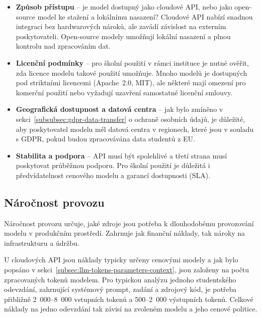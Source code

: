 \begin{itemize}
    \item \textbf{Způsob přístupu} -- je model dostupný jako cloudové API, nebo jako open-source model ke stažení a lokálnímu nasazení?
    Cloudové API nabízí snadnou integraci bez hardwarových nároků, ale zavádí závislost na externím poskytovateli.
    Open-source modely umožňují lokální nasazení a plnou kontrolu nad zpracováním dat.

    \item \textbf{Licenční podmínky} -- pro školní použití v rámci instituce je nutné ověřit, zda licence modelu takové použití umožňuje.
    Mnoho modelů je dostupných pod striktními licencemi (Apache~2.0, MIT), ale některé mají omezení pro komerční použití nebo vyžadují uzavření samostatné licenční smlouvy.

    \item \textbf{Geografická dostupnost a datová centra} -- jak bylo zmíněno v sekci~\ref{subsubsec:gdpr-data-transfer} o ochraně osobních údajů, je důležité, aby poskytovatel modelu měl datová centra v regionech, které jsou v souladu s GDPR, pokud budou zpracovávána data studentů z EU\@.

    \item \textbf{Stabilita a podpora} -- API musí být spolehlivé a třetí strana musí poskytovat průběžnou podporu.
    Pro školní použití je důležitá i předvídatelnost cenového modelu a garancí dostupnosti (SLA).
\end{itemize}

\subsection{Náročnost provozu}
\label{subsec:criteria-operational}

Náročnost provozu určuje, jaké zdroje jsou potřeba k dlouhodobému provozování modelu v produkčním prostředí.
Zahrnuje jak finanční náklady, tak nároky na infrastrukturu a údržbu.

U cloudových API jsou náklady typicky určeny cenovými modely a jak bylo popsáno v sekci~\ref{subsec:llm-tokens-parameters-context}, jsou založeny na počtu zpracovaných tokenů modelem.
Pro typickou analýzu jednoho studentského odevzdání, zahrnující systémový prompt, zadání a zdrojový kód, je potřeba přibližně 2~000--8~000  vstupních tokenů a 500--2~000 výstupních tokenů. 
Celkové náklady na jedno odevzdání tak závisí na zvoleném modelu a jeho cenové politice.

